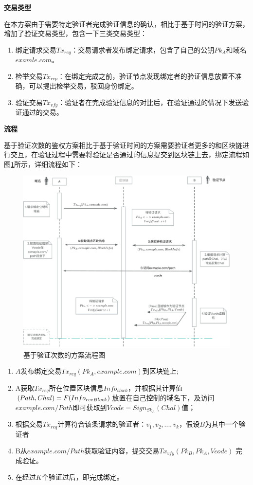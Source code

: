 \noindent\textbf{交易类型}

在本方案由于需要特定验证者完成验证信息的确认，相比于基于时间的验证方案，增加了验证交易类型，包含一下三类交易类型：

\begin{enumerate}
	\item 绑定请求交易$Tx_{req}$：交易请求者发布绑定请求，包含了自己的公钥$Pk_A$和域名$examle.com$。
	\item 检举交易$Tx_{rep}$：在绑定完成之前，验证节点发现绑定者的验证信息放置不准确，可以提出检举交易，驳回身份绑定。
	\item 验证交易$Tx_{vfy}$：验证者在完成验证信息的对比后，在验证通过的情况下发送验证通过的交易。
\end{enumerate}

\noindent\textbf{流程}

基于验证次数的鉴权方案相比于基于验证时间的方案需要验证者更多的和区块链进行交互，在验证过程中需要将验证是否通过的信息提交到区块链上去，绑定流程如图\ref{fig:count_based_workflow}所示，详细流程如下：

\begin{figure}[htbp]
 	\centering
 	\includegraphics[width = 1\textwidth]{img/count_based_workflow}
 	\caption{基于验证次数的方案流程图}\label{fig:count_based_workflow}
\end{figure}

\begin{enumerate}
	\item $A$发布绑定交易$Tx_{req}(Pk_A, example.com)$到区块链上;
	\item  A获取$Tx_{req}$所在位置区块信息$Info_{block}$，并根据其计算值$(Path, Chal) = \\F(Info_{rcvBlock})$放置在自己控制的域名下，及访问$example.com/Path$即可获取到$Vcode = Sign_{Sk_A}(Chal)$值；
	\item 根据交易$Tx_{req}$计算符合该条请求的验证者：${v_1, v_2, ... , v_k}$，假设$B$为其中一个验证者
	\item B从$example.com/Path$获取验证内容，提交交易$Tx_{vfy}(Pk_B, Pk_A, Vcode)$ 完成验证。
	\item 在经过$K$个验证过后，即完成绑定。
\end{enumerate}

